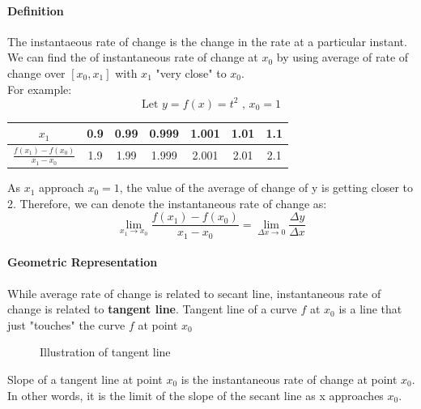 \documentclass[12pt]{article}
\begin{document}
\paragraph{Definition} The instantaeous rate of change is the change in the rate at a particular instant. 
We can find the of instantaneous rate of change at $x_0$ by using average of rate of change over $[x_0, x_1]$ with
$x_1$ "very close" to $x_0$. \\
\noindent
For example:
\[
    \textrm{Let }y = f(x) = t^2 \textrm{ , } x_0 = 1
\]
\begin{center}
    \begin{tabular}{|c|c|c|c|c|c|c|}
        \hline
        $x_1$ & 0.9 & 0.99 & 0.999 & 1.001 & 1.01 & 1.1 \\
        \hline
        $\frac{f(x_1) - f(x_0)}{x_1 - x_0}$ & 1.9 & 1.99 & 1.999 & 2.001 & 2.01 & 2.1\\
        \hline
    \end{tabular}
\end{center}

As $x_1$ approach $x_0 = 1$, the value of the average of change of y is getting closer to 2.
Therefore, we can denote the instantaneous rate of change as:
\[
    \lim_{x_1 \to x_0} \frac{f(x_1) - f(x_0)}{x_1 - x_0} = \lim_{\Delta x \to 0} \frac{\Delta y}{\Delta x}
\]

\paragraph{Geometric Representation} While average rate of change is related to secant line, instantaneous rate of change
is related to \textbf{tangent line}. Tangent line of a curve $f$ at $x_0$ is a line that just "touches" the curve $f$ at 
point $x_0$

\vspace*{0.5cm}

\begin{figure}[h!]
\centering
    \caption{Illustration of tangent line}
\end{figure}
\noindent
Slope of a tangent line at point $x_0$ is the instantaneous rate of change at point $x_0$.
In other words, it is the limit of the slope of the secant line as x approaches $x_0$.
\end{document}
